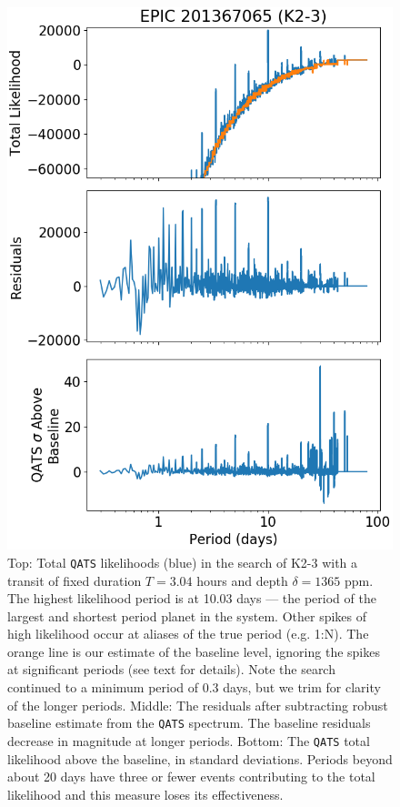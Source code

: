 \documentclass[twocolumn]{aastex62}
\newcommand{\pipeline}[1]{\texttt{#1}}
\begin{document}
\begin{figure}[tbp]
\includegraphics[width=\columnwidth]{qatsspec.png}
\caption{Top: Total \pipeline{QATS} likelihoods (blue) in the search
  of K2-3 with a transit of fixed duration $T=3.04$ hours and depth
  $\delta = 1365$ ppm. The highest likelihood period is at 10.03 days
  --- the period of the largest and shortest period planet in the
  system. Other spikes of high likelihood occur at aliases of the true
  period (e.g. 1:N). The orange line is our estimate of the baseline
  level, ignoring the spikes at significant periods (see text for
  details). Note the search continued to a minimum period of 0.3 days,
  but we trim for clarity of the longer periods.  Middle: The
  residuals after subtracting robust baseline estimate from the
  \pipeline{QATS} spectrum. The baseline residuals decrease in
  magnitude at longer periods.  Bottom: The \pipeline{QATS} total
  likelihood above the baseline, in standard deviations. Periods
  beyond about 20 days have three or fewer events contributing to the
  total likelihood and this measure loses its
  effectiveness. \label{qatsspec}}
\end{figure}
\end{document}

